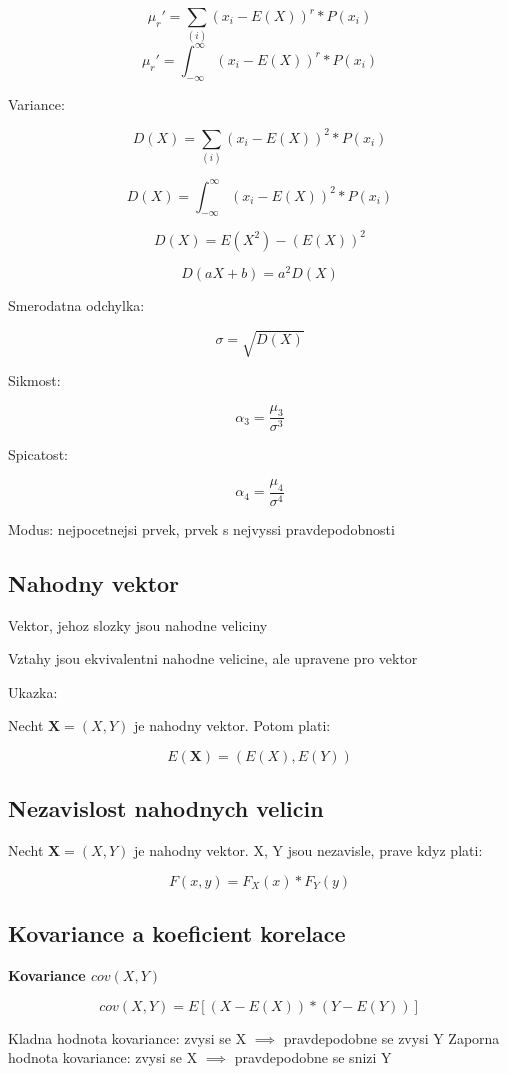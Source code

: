 \documentclass{article}
\begin{document}
\[ \mu_r' = \sum_{(i)} (x_i - E(X))^r * P(x_i) \]
\[ \mu_r' = \int_{-\infty}^{\infty} (x_i - E(X))^r * P(x_i) \]

Variance:

\[ D(X) = \sum_{(i)} (x_i - E(X))^2 * P(x_i) \]

\[ D(X) = \int_{-\infty}^{\infty} (x_i - E(X))^2 * P(x_i) \]

\[ D(X) = E(X^2) - (E(X))^2 \]

\[ D(aX + b) = a^2D(X) \]

Smerodatna odchylka:

\[ \sigma = \sqrt{D(X)} \]

Sikmost:

\[ \alpha_3 = \frac {\mu_3} {\sigma^3} \]

Spicatost:

\[ \alpha_4 = \frac {\mu_4} {\sigma^4} \]

Modus: nejpocetnejsi prvek, prvek s nejvyssi pravdepodobnosti

\subsection{Nahodny vektor}

Vektor, jehoz slozky jsou nahodne veliciny

Vztahy jsou ekvivalentni nahodne velicine, ale upravene pro vektor

Ukazka:

Necht $\boldsymbol{X} = (X, Y)$ je nahodny vektor. Potom plati:

\[ E(\boldsymbol{X}) = (E(X), E(Y)) \]

\subsection{Nezavislost nahodnych velicin}

Necht $\boldsymbol{X} = (X, Y)$ je nahodny vektor. X, Y jsou nezavisle, prave kdyz plati:

\[ F(x,y) = F_X(x) * F_Y(y) \]

\subsection{Kovariance a koeficient korelace}

\textbf{Kovariance $cov(X,Y)$}

\[ cov(X,Y) = E[(X - E(X)) * (Y - E(Y))] \]

Kladna hodnota kovariance: zvysi se X $\implies$ pravdepodobne se zvysi Y
Zaporna hodnota kovariance: zvysi se X $\implies$ pravdepodobne se snizi Y
\end{document}
